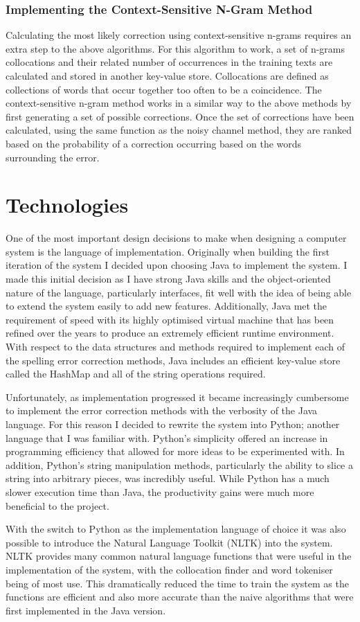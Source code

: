 \subsubsection{Implementing the Context-Sensitive N-Gram Method}
Calculating the most likely correction using context-sensitive n-grams requires an extra step to the above algorithms. For this algorithm to work, a set of n-grams collocations and their related number of occurrences in the training texts are calculated and stored in another key-value store. Collocations are defined as collections of words that occur together too often to be a coincidence. The context-sensitive n-gram method works in a similar way to the above methods by first generating a set of possible corrections. Once the set of corrections have been calculated, using the same function as the noisy channel method, they are ranked based on the probability of a correction occurring based on the words surrounding the error.

\section{Technologies}
One of the most important design decisions to make when designing a computer system is the language of implementation. Originally when building the first iteration of the system I decided upon choosing Java to implement the system. I made this initial decision as I have strong Java skills and the object-oriented nature of the language, particularly interfaces, fit well with the idea of being able to extend the system easily to add new features. Additionally, Java met the requirement of speed with its highly optimised virtual machine that has been refined over the years to produce an extremely efficient runtime environment. With respect to the data structures and methods required to implement each of the spelling error correction methods, Java includes an efficient key-value store called the HashMap and all of the string operations required.

Unfortunately, as implementation progressed it became increasingly cumbersome to implement the error correction methods with the verbosity of the Java language. For this reason I decided to rewrite the system into Python; another language that I was familiar with. Python's simplicity offered an increase in programming efficiency that allowed for more ideas to be experimented with. In addition, Python's string manipulation methods, particularly the ability to slice a string into arbitrary pieces, was incredibly useful. While Python has a much slower execution time than Java, the productivity gains were much more beneficial to the project.

With the switch to Python as the implementation language of choice it was also possible to introduce the Natural Language Toolkit (NLTK) \cite{} into the system. NLTK provides many common natural language functions that were useful in the implementation of the system, with the collocation finder and word tokeniser being of most use. This dramatically reduced the time to train the system as the functions are efficient and also more accurate than the naive algorithms that were first implemented in the Java version.
